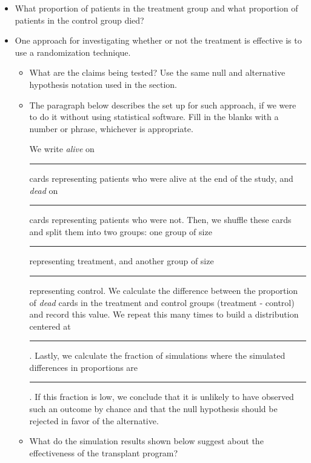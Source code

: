 \begin{itemize}


\item What proportion of patients in the treatment group and what proportion of patients in the control group died?


\item One approach for investigating whether or not the treatment is effective is to use a randomization technique.


\begin{itemize}


\item What are the claims being tested? Use the same null and alternative hypothesis notation used in the section.


\item The paragraph below describes the set up for such approach, if we were to do it without using statistical software. Fill in the blanks with a number or phrase, whichever is appropriate.


We write \textit{alive} on \rule{2cm}{0.5pt} cards representing patients who were alive at the end of the study, and \textit{dead} on \rule{2cm}{0.5pt} cards representing patients who were not. Then, we shuffle these cards and split them into two groups: one group of size \rule{2cm}{0.5pt} representing treatment, and another group of size \rule{2cm}{0.5pt} representing control. We calculate the difference between the proportion of \textit{dead} cards in the treatment and control groups (treatment - control) and record this value. We repeat this many times to build a distribution centered at \rule{2cm}{0.5pt}. Lastly, we calculate the fraction of simulations where the simulated differences in proportions are \rule{2cm}{0.5pt}. If this fraction is low, we conclude that it is unlikely to have observed such an outcome by chance and that the null hypothesis should be rejected in favor of the alternative.


\item What do the simulation results shown below suggest about the effectiveness of the transplant program?


\end{itemize}


\end{itemize}


